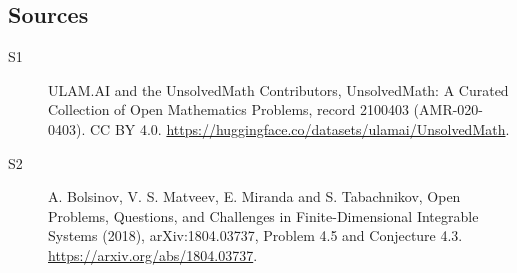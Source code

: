\documentclass[11pt]{article}
\begin{document}
\subsection{Sources}
\begin{description}
\item[\hypertarget{source:2100403:1}{S1}] ULAM.AI and the UnsolvedMath Contributors, UnsolvedMath: A Curated Collection of Open Mathematics Problems, record 2100403 (AMR-020-0403). CC BY 4.0. \url{https://huggingface.co/datasets/ulamai/UnsolvedMath}.
\item[\hypertarget{source:2100403:2}{S2}] A. Bolsinov, V. S. Matveev, E. Miranda and S. Tabachnikov, Open Problems, Questions, and Challenges in Finite-Dimensional Integrable Systems (2018), arXiv:1804.03737, Problem 4.5 and Conjecture 4.3. \url{https://arxiv.org/abs/1804.03737}.
\end{description}
\label{end:2100403}
\end{document}

